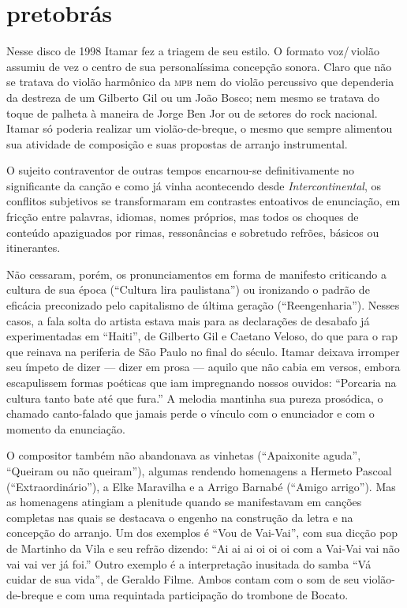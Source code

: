 \section{pretobrás}

Nesse disco de 1998 Itamar fez a triagem de seu estilo. O formato
voz/\,violão assumiu de vez o centro de sua personalíssima concepção
sonora. Claro que não se tratava do violão harmônico da \textsc{mpb} nem do
violão percussivo que dependeria da destreza de um Gilberto Gil ou um
João Bosco; nem mesmo se tratava do toque de palheta à maneira de Jorge
Ben Jor ou de setores do rock nacional. Itamar só poderia realizar um
violão-de-breque, o mesmo que sempre alimentou sua atividade de
composição e suas propostas de arranjo instrumental.

O sujeito contraventor de outras tempos encarnou-se definitivamente no
significante da canção e como já vinha acontecendo desde
\textit{Intercontinental}, os conflitos subjetivos se transformaram em contrastes
entoativos de enunciação, em fricção entre palavras, idiomas, nomes
próprios, mas todos os choques de conteúdo apaziguados por rimas,
ressonâncias e sobretudo refrões, básicos ou itinerantes.

Não cessaram, porém, os pronunciamentos em forma de manifesto criticando a cultura de sua época (``Cultura lira paulistana'') ou ironizando o
padrão de eficácia preconizado pelo capitalismo de última geração
(``Reengenharia''). Nesses casos, a fala solta do artista estava mais para
as declarações de desabafo já experimentadas em ``Haiti'', de Gilberto Gil e
Caetano Veloso, do que para o rap que reinava na periferia de São Paulo
no final do século. Itamar deixava irromper seu ímpeto de dizer ---
dizer em prosa --- aquilo que não cabia em versos, embora escapulissem
formas poéticas que iam impregnando nossos ouvidos: ``Porcaria na
cultura tanto bate até que fura.'' A melodia mantinha sua pureza
prosódica, o chamado canto-falado que jamais perde o vínculo com o
enunciador e com o momento da enunciação.

O compositor também não abandonava as vinhetas (``Apaixonite aguda'',
``Queiram ou não queiram''), algumas rendendo homenagens a Hermeto Pascoal
(``Extraordinário''), a Elke Maravilha e a Arrigo Barnabé (``Amigo arrigo'').
Mas as homenagens atingiam a plenitude quando se manifestavam em canções
completas nas quais se destacava o engenho na construção da letra e na
concepção do arranjo. Um dos exemplos é ``Vou de Vai-Vai'', com sua dicção
pop de Martinho da Vila e seu refrão dizendo: ``Ai ai ai oi oi oi com a
Vai-Vai vai não vai vai ver já foi.'' Outro exemplo é a interpretação
inusitada do samba ``Vá cuidar de sua vida'', de Geraldo Filme. Ambos contam
com o som de seu violão-de-breque e com uma requintada participação do
trombone de Bocato.

